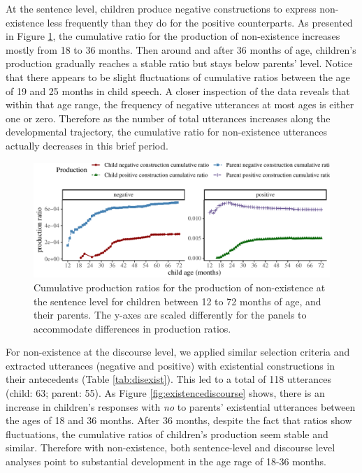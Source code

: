 \documentclass[
  man,floatsintext]{apa6}
\begin{document}
At the sentence level, children produce negative constructions to express non-existence less frequently than they do for the positive counterparts. As presented in Figure \ref{fig:existence}, the cumulative ratio for the production of non-existence increases mostly from 18 to 36 months. Then around and after 36 months of age, children's production gradually reaches a stable ratio but stays below parents' level. Notice that there appears to be slight fluctuations of cumulative ratios between the age of 19 and 25 months in child speech. A closer inspection of the data reveals that within that age range, the frequency of negative utterances at most ages is either one or zero. Therefore as the number of total utterances increases along the developmental trajectory, the cumulative ratio for non-existence utterances actually decreases in this brief period.

\begin{figure}[H]

{\centering \includegraphics{neg_construction_article_files/figure-latex/existence-1} 

}

\caption{Cumulative production ratios for the production of non-existence at the sentence level for children between 12 to 72 months of age, and their parents. The y-axes are scaled differently for the panels to accommodate differences in production ratios.}\label{fig:existence}
\end{figure}

For non-existence at the discourse level, we applied similar selection criteria and extracted utterances (negative and positive) with existential constructions in their antecedents (Table \ref{tab:disexist}). This led to a total of 118 utterances (child: 63; parent: 55). As Figure \ref{fig:existencediscourse} shows, there is an increase in children's responses with \emph{no} to parents' existential utterances between the ages of 18 and 36 months. After 36 months, despite the fact that ratios show fluctuations, the cumulative ratios of children's production seem stable and similar. Therefore with non-existence, both sentence-level and discourse level analyses point to substantial development in the age rage of 18-36 months.
\end{document}
